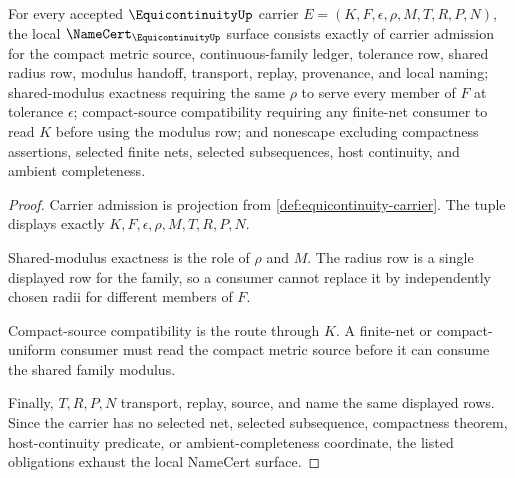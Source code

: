 \begin{theorem}
\label{thm:equicontinuity-namecert-obligations}
For every accepted $\EquicontinuityUp$ carrier $E=(K,F,\epsilon,\rho,M,T,R,P,N)$, the local $\NameCert_{\EquicontinuityUp}$ surface consists exactly of carrier admission for the compact metric source, continuous-family ledger, tolerance row, shared radius row, modulus handoff, transport, replay, provenance, and local naming; shared-modulus exactness requiring the same $\rho$ to serve every member of $F$ at tolerance $\epsilon$; compact-source compatibility requiring any finite-net consumer to read $K$ before using the modulus row; and nonescape excluding compactness assertions, selected finite nets, selected subsequences, host continuity, and ambient completeness.
\end{theorem}
\begin{proof}
Carrier admission is projection from \autoref{def:equicontinuity-carrier}. The tuple displays exactly $K,F,\epsilon,\rho,M,T,R,P,N$.

Shared-modulus exactness is the role of $\rho$ and $M$. The radius row is a single displayed row for the family, so a consumer cannot replace it by independently chosen radii for different members of $F$.

Compact-source compatibility is the route through $K$. A finite-net or compact-uniform consumer must read the compact metric source before it can consume the shared family modulus.

Finally, $T,R,P,N$ transport, replay, source, and name the same displayed rows. Since the carrier has no selected net, selected subsequence, compactness theorem, host-continuity predicate, or ambient-completeness coordinate, the listed obligations exhaust the local NameCert surface.
\end{proof}

